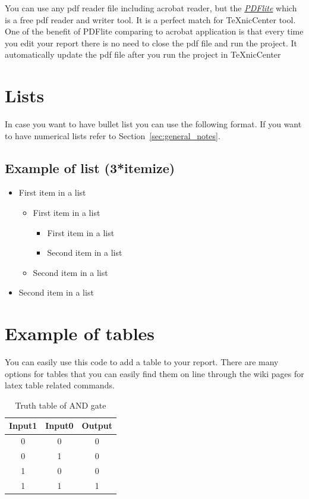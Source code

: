\documentclass[paper=letter, fontsize=11pt]{scrartcl} %
\numberwithin{equation}{section} %
\numberwithin{figure}{section} %
\numberwithin{table}{section} %
\begin{document}
\subsubsection{}
You can use any pdf reader file including acrobat reader, but the \href{http://www.pdflite.com/}{\textit{PDFlite}} which is a free pdf reader and writer tool. It  is a perfect match for TeXnicCenter tool. One of the benefit of PDFlite comparing to acrobat application is that every time you edit your report there is no need to close the pdf file and run the project. It automatically update the pdf file after you run the project in TeXnicCenter


\section{Lists}


In case you want to have bullet list you can use the following format. If you want to have numerical lists refer to Section~\ref{sec:general_notes}.
\subsection{Example of list (3*itemize)}
\begin{itemize}
	\item First item in a list 
		\begin{itemize}
		\item First item in a list 
			\begin{itemize}
			\item First item in a list 
			\item Second item in a list 
			\end{itemize}
		\item Second item in a list 
		\end{itemize}
	\item Second item in a list 
\end{itemize}

\section{Example of tables}
You can easily use this code to add a table to your report. There are many options for tables that you can easily find them on line through the wiki pages for latex table related commands.
\begin{table}[h]
\centering
\caption{Truth table of AND gate}
\label{my-label}
\begin{tabular}{|c|c||c|}
\hline
\textbf{Input1} & \textbf{Input0} & \textbf{Output}    \\
\hline 
0&0  &0    \\
\hline
 0&1  &0    \\
\hline
 1&0  & 0 \\
\hline
1&1 &1  \\
\hline
\end{tabular}
\end{table}
\end{document}
